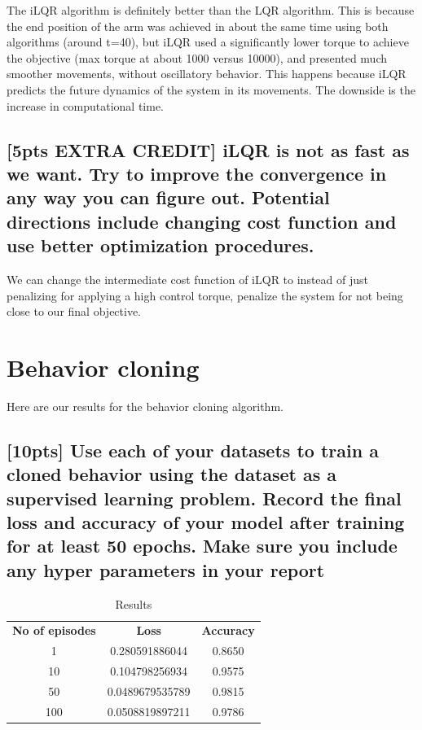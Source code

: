 \documentclass{article}
\begin{document}
The iLQR algorithm is definitely better than the LQR algorithm. This is because the end position of the arm was achieved in about the same time using both algorithms (around t=40), but iLQR used a significantly lower torque to achieve the objective (max torque at about 1000 versus 10000), and presented much smoother movements, without oscillatory behavior. This happens because iLQR predicts the future dynamics of the system in its movements. The downside is the increase in computational time.

\subsection{[5pts EXTRA CREDIT] iLQR is not as fast as we want. Try to improve the convergence in any way you can figure out. Potential directions include changing cost function and use better optimization procedures.}

We can change the intermediate cost function of iLQR to instead of just penalizing for applying a high control torque, penalize the system for not being close to our final objective. 



\section{Behavior cloning}
Here are our results for the behavior cloning algorithm. 

\subsection{[10pts] Use each of your datasets to train a cloned behavior using the dataset as a supervised learning problem. Record the final loss and accuracy of your model after training for at least 50 epochs. Make sure you include any hyper parameters in your report}

\begin{table}[H]
\centering
\caption{Results}
\label{my-label}
\begin{tabular}{ccc}
\textbf{No of episodes} & \textbf{Loss}  & \textbf{Accuracy} \\
1                       & 0.280591886044 & 0.8650    \\
10                     & 0.104798256934 & 0.9575   \\
50                     & 0.0489679535789 & 0.9815   \\
100                   & 0.0508819897211 & 0.9786
\end{tabular}
\end{table}
\end{document}
